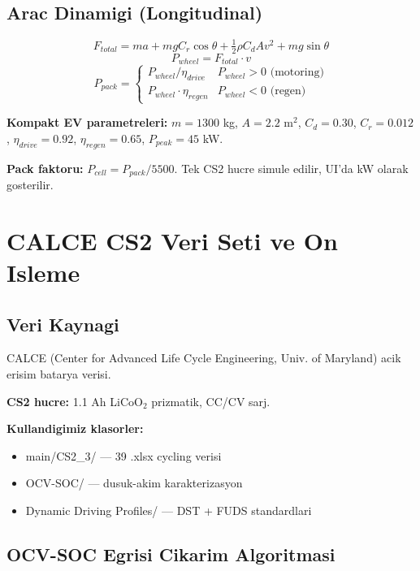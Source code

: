 \documentclass[11pt,a4paper]{article}
\begin{document}
\subsection{Arac Dinamigi (Longitudinal)}

\[
F_{total} = m a + m g C_r \cos\theta + \tfrac{1}{2} \rho C_d A v^2 + m g \sin\theta
\]
\[
P_{wheel} = F_{total} \cdot v
\]
\[
P_{pack} = \begin{cases} P_{wheel}/\eta_{drive} & P_{wheel} > 0 \text{ (motoring)} \\ P_{wheel} \cdot \eta_{regen} & P_{wheel} < 0 \text{ (regen)} \end{cases}
\]

\textbf{Kompakt EV parametreleri:} $m=1300$ kg, $A=2.2$ m$^2$, $C_d=0.30$, $C_r=0.012$, $\eta_{drive}=0.92$, $\eta_{regen}=0.65$, $P_{peak}=45$ kW.

\textbf{Pack faktoru:} $P_{cell} = P_{pack}/5500$. Tek CS2 hucre simule edilir, UI'da kW olarak gosterilir.

\section{CALCE CS2 Veri Seti ve On Isleme}

\subsection{Veri Kaynagi}

CALCE (Center for Advanced Life Cycle Engineering, Univ. of Maryland) acik erisim batarya verisi.

\textbf{CS2 hucre:} 1.1 Ah LiCoO$_2$ prizmatik, CC/CV sarj.

\textbf{Kullandigimiz klasorler:}
\begin{itemize}
  \item main/CS2\_3/ --- 39 .xlsx cycling verisi
  \item OCV-SOC/ --- dusuk-akim karakterizasyon
  \item Dynamic Driving Profiles/ --- DST + FUDS standardlari
\end{itemize}

\subsection{OCV-SOC Egrisi Cikarim Algoritmasi}
\end{document}
